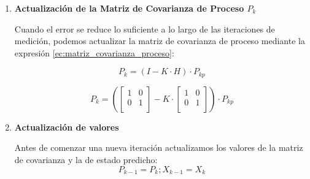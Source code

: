\begin{enumerate}
\begin{equation}
    X_k =
    X_{kp}
    +
    K
    \cdot (
        \begin{bmatrix} x_{km} \\ v_{km} \\ \end{bmatrix}
        -
        \begin{bmatrix}
        1 & 0 \\
        0 & 1  \\
        \end{bmatrix}
        \cdot
        X_{kp}
    )  
\end{equation}

\item \textbf{Actualización de la Matriz de Covarianza de Proceso $P_k$} \mbox{} \vspace{4pt}

Cuando el error se reduce lo suficiente a lo largo de las iteraciones de medición, podemos actualizar la matriz de covarianza de proceso mediante la expresión
\ref{ec:matriz_covarianza_proceso}:

\begin{equation}
    P_k = ( I - K \cdot H ) \cdot P_{kp}
    \label{ec:matriz_covarianza_proceso}
\end{equation}

\begin{equation}
    P_k =
    (
    \begin{bmatrix}
        1 & 0 \\
        0 & 1  \\
    \end{bmatrix}
    -
    K
    \cdot
    \begin{bmatrix}
        1 & 0 \\
        0 & 1  \\
    \end{bmatrix}
    )
    \cdot
    P_{kp}  
\end{equation}

\item \textbf{Actualización de valores} \mbox{} \vspace{4pt}

Antes de comenzar una nueva iteración actualizamos los valores de la matriz de covarianza y la de estado predicho:
\begin{equation}
    P_{k-1} = P_k ; X_{k-1} = X_k  
\end{equation}

\end{enumerate}

